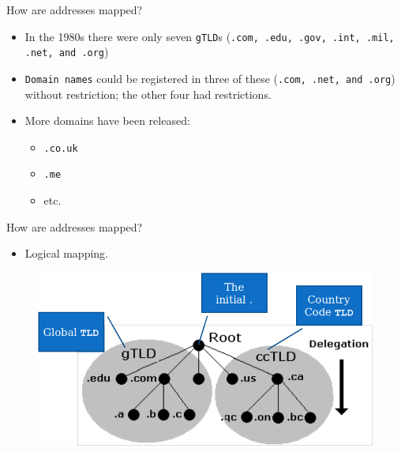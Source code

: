 \documentclass[xcolor=table,aspectratio=169]{beamer}
\begin{document}
\begin{frame}{How are addresses mapped?}
  \begin{itemize}
    \item In the 1980s there were only seven \texttt{gTLD}s (\texttt{.com, .edu, .gov, .int, .mil, .net, and .org}) 
    \item \texttt{Domain names} could be registered in three of these (\texttt{.com, .net, and .org}) without restriction; the other four had restrictions.
    \item More domains have been released:
      \begin{itemize}
        \item \texttt{.co.uk}
        \item \texttt{.me}
        \item etc.
      \end{itemize}
  \end{itemize}
\end{frame}

\begin{frame}{How are addresses mapped?}
  \begin{itemize}
    \item Logical mapping. 
  \end{itemize}
  \begin{figure}
    \begin{center}
      \includegraphics[width=0.6\linewidth]{DNS.png}
    \end{center}
  \end{figure}
\end{frame}
\end{document}
